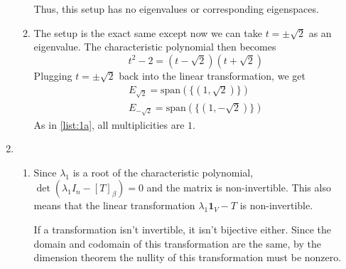 \documentclass[12pt]{article}
\begin{document}
\begin{enumerate}
\begin{enumerate}
                        Thus, this setup has no eigenvalues or corresponding eigenspaces.
                  \item The setup is the exact same except now we can take $t=\pm\sqrt{2}$ as an eigenvalue.
                        The characteristic polynomial then becomes
                        \[t^2-2=(t-\sqrt{2})(t+\sqrt{2})\]
                        Plugging $t=\pm \sqrt{2}$ back into the linear transformation, we get
                        \begin{gather*}
                              E_{\sqrt{2}}=\text{span}(\{(1, \sqrt{2})\}) \\
                              E_{-\sqrt{2}}=\text{span}(\{(1, -\sqrt{2})\})
                        \end{gather*}
                        As in \ref{list:1a}, all multiplicities are $1$.
            \end{enumerate}

            \pagebreak

      \item \begin{enumerate}
                  \item Since $\lambda_1$ is a root of the characteristic polynomial,
                        $\det\left(\lambda_1 I_n - [T]_\beta\right)=0$ and the matrix is non-invertible.
                        This also means that the linear transformation $\lambda_1 \mathbf{1}_V - T$ is non-invertible.

                        If a transformation isn't invertible, it isn't bijective either.
                        Since the domain and codomain of this transformation are the same,
                        by the dimension theorem the nullity of this transformation must be nonzero.


\end{enumerate}
\end{enumerate}
\end{document}
